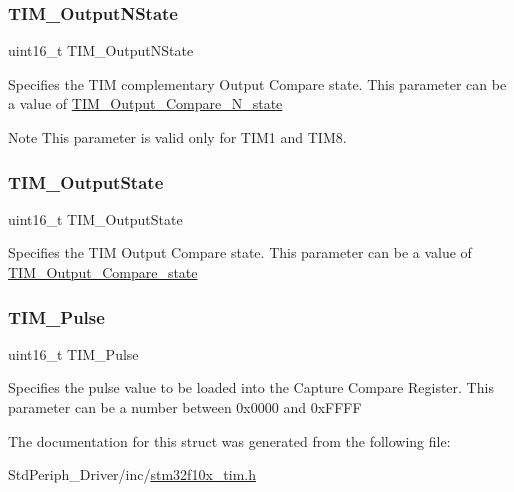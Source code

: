 \subsubsection{\texorpdfstring{TIM\_OutputNState}{TIM\_OutputNState}}
{\footnotesize\ttfamily uint16\+\_\+t T\+I\+M\+\_\+\+Output\+N\+State}

Specifies the T\+IM complementary Output Compare state. This parameter can be a value of \mbox{\hyperlink{group___t_i_m___output___compare___n__state}{T\+I\+M\+\_\+\+Output\+\_\+\+Compare\+\_\+\+N\+\_\+state}} \begin{DoxyNote}{Note}
This parameter is valid only for T\+I\+M1 and T\+I\+M8. 
\end{DoxyNote}
\mbox{\label{struct_t_i_m___o_c_init_type_def_a1e88e3081574da1e1abc089df87985ba}} 
\subsubsection{\texorpdfstring{TIM\_OutputState}{TIM\_OutputState}}
{\footnotesize\ttfamily uint16\+\_\+t T\+I\+M\+\_\+\+Output\+State}

Specifies the T\+IM Output Compare state. This parameter can be a value of \mbox{\hyperlink{group___t_i_m___output___compare__state}{T\+I\+M\+\_\+\+Output\+\_\+\+Compare\+\_\+state}} \mbox{\label{struct_t_i_m___o_c_init_type_def_a3f43bd9158c651d6d9fa2720ad75ab01}} 
\subsubsection{\texorpdfstring{TIM\_Pulse}{TIM\_Pulse}}
{\footnotesize\ttfamily uint16\+\_\+t T\+I\+M\+\_\+\+Pulse}

Specifies the pulse value to be loaded into the Capture Compare Register. This parameter can be a number between 0x0000 and 0x\+F\+F\+FF 

The documentation for this struct was generated from the following file\+:\begin{DoxyCompactItemize}
\item 
Std\+Periph\+\_\+\+Driver/inc/\mbox{\hyperlink{stm32f10x__tim_8h}{stm32f10x\+\_\+tim.\+h}}\end{DoxyCompactItemize}
